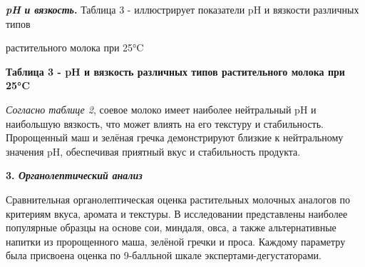 {\bfseries \emph{pH и вязкость}.} Таблица 3 - иллюстрирует показатели pH и
вязкости различных типов

растительного молока при 25°C

{\bfseries Таблица 3 - pH и вязкость различных типов растительного молока
при 25°C}


\emph{Согласно таблице 2}, соевое молоко имеет наиболее нейтральный pH и
наибольшую вязкость, что может влиять на его текстуру и стабильность.
Пророщенный маш и зелёная гречка демонстрируют близкие к нейтральному
значения pH, обеспечивая приятный вкус и стабильность продукта.

{\bfseries 3. \emph{Органолептический анализ}}

Сравнительная органолептическая оценка растительных молочных аналогов по
критериям вкуса, аромата и текстуры. В исследовании представлены
наиболее популярные образцы на основе сои, миндаля, овса, а также
альтернативные напитки из пророщенного маша, зелёной гречки и проса.
Каждому параметру была присвоена оценка по 9-балльной шкале
экспертами-дегустаторами.



